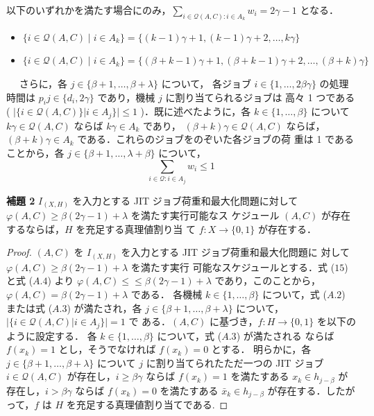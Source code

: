 \documentclass[12pt]{optlab-bachelor}
\begin{document}
以下のいずれかを満たす場合にのみ，$\displaystyle \sum_{i \in \mathcal{Q}(A,C):i \in A_k}w_i =
2\gamma - 1$ となる．
\begin{itemize}
\item $\{i \in \mathcal{Q}(A,C) \mid i \in A_k\} = \{(k - 1)\gamma + 1, (k
  - 1)\gamma + 2,\ldots,k\gamma\} \label{A.2}$
\item $\{i \in \mathcal{Q}(A,C) \mid i \in A_k\} = \{(\beta + k -
  1)\gamma + 1, (\beta + k
  - 1)\gamma + 2,\ldots,(\beta + k)\gamma\} \label{A.3}$
\end{itemize}　
さらに，各 $j \in \{\beta + 1,\ldots, \beta + \lambda \}$ について，
各ジョブ $i \in \{1,\ldots, 2\beta \gamma \}$ の処理時間は $p_ij
\in \{d_i, 2\gamma \}$ であり，機械 $j$ に割り当てられるジョブは
高々 1 つである ( $|\{i \in \mathcal{Q}(A, C)\} | i \in A_j \}| \le 1$
)．既に述べたように，各 $k \in \{1,\ldots,\beta \}$ について
$k\gamma \in \mathcal{Q}(A,C)$ ならば $k\gamma \in A_k$ であり，
$(\beta + k) \gamma \in \mathcal{Q}(A,C)$ ならば，$(\beta +
k)\gamma \in A_k$ である．これらのジョブをのぞいた各ジョブの荷
重は 1 であることから，各 $j \in \{ \beta + 1,\ldots,
\lambda + \beta \}$ について，
$$\displaystyle \sum_{i \in \mathcal{Q}:i \in A_j}w_i \le 1 \label{A.4}$$

\noindent \textbf{補題 2}
$I_{(X,H)}$ を入力とする JIT ジョブ荷重和最大化問題に対して
$\varphi(A, C) \ge \beta(2\gamma − 1) + \lambda$ を満たす実行可能なス
ケジュール $(A, C)$ が存在するならば，$H$ を充足する真理値割り当
て $f : X \to \{0, 1\}$ が存在する．

\begin{proof}
  $(A, C)$ を $I_{(X,H)}$ を入力とする JIT ジョブ荷重和最大化問題に
  対して $\varphi(A, C) \ge \beta (2\gamma − 1) + \lambda$ を満たす実行
  可能なスケジュールとする．式 ($15$) と式 ($A.4$) より $\varphi(A, C
  )\le≤ \beta(2\gamma − 1) + \lambda$ であり，このことから，
  $\varphi(A, C) = \beta (2\gamma − 1) + \lambda$ である．
  各機械 $k \in \{1,\ldots, \beta\}$ について，式 ($A.2$) または式
  ($A.3$) が満たされ，各 $j \in \{ \beta + 1,\ldots,\beta + \lambda
  \}$ について，$|\{ i \in \mathcal{Q}(A,C) | i \in A_j \} | = 1$ で
  ある．$(A,C)$ に基づき，$f : H \to \{0,1\}$ を以下のように設定する．
  各 $k \in \{1,\ldots, \beta \}$ について，式 ($A.3$) が満たされる
  ならば $f(x_k) = 1$ とし，そうでなければ $f(x_k) = 0$ とする．
  明らかに，各 $j \in \{\beta + 1,\ldots,\beta + \lambda \}$ について
  $j$ に割り当てられたただ一つの JIT ジョブ $i \in
  \mathcal{Q}(A,C)$ が存在し，$i \ge \beta \gamma$ ならば $f(x_k)
  = 1$ を満たすある $x_k \in h_{j - \beta}$ が存在し，$i > \beta
  \gamma$ ならば $f(x_k) = 0$ を満たすある $\bar x_k \in h_{j -
    \beta}$ が存在する．したがって，$f$ は $H$ を充足する真理値割り当てである.
\end{proof}
\end{document}
